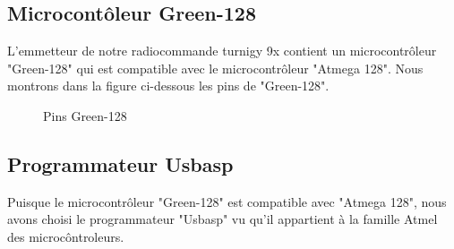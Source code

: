 	\subsection{Microcontôleur Green-128}
	L'emmetteur de notre radiocommande turnigy 9x contient un microcontrôleur "Green-128" qui est compatible avec le microcontrôleur  "Atmega 128". Nous montrons dans la figure ci-dessous les pins de "Green-128". 
	\begin{figure}[H]
		\begin{center}
			\centering
		\end{center}
		\caption{Pins Green-128\label{fig:P.G}}
	\end{figure}

	\subsection{Programmateur Usbasp}
	Puisque le microcontrôleur "Green-128" est compatible avec "Atmega 128", nous avons choisi le programmateur "Usbasp" vu qu'il appartient à la famille Atmel des microcôntroleurs. 
	
